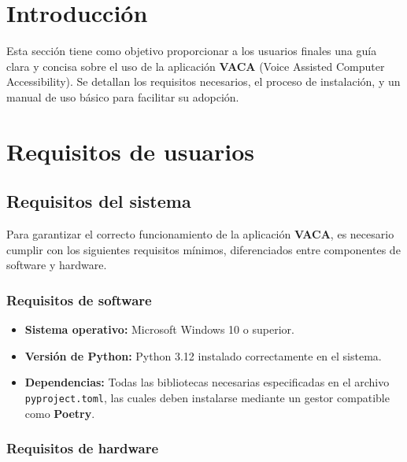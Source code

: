 
\section{Introducción}

Esta sección tiene como objetivo proporcionar a los usuarios finales una guía clara y concisa sobre el uso de la aplicación \textbf{VACA} (Voice Assisted Computer Accessibility). Se detallan los requisitos necesarios, el proceso de instalación, y un manual de uso básico para facilitar su adopción.

\section{Requisitos de usuarios}

\subsection{Requisitos del sistema}

Para garantizar el correcto funcionamiento de la aplicación \textbf{VACA}, es necesario cumplir con los siguientes requisitos mínimos, diferenciados entre componentes de software y hardware.

\subsubsection{Requisitos de software}

\begin{itemize}
    \item \textbf{Sistema operativo:} Microsoft Windows 10 o superior.
    \item \textbf{Versión de Python:} Python 3.12 instalado correctamente en el sistema.
    \item \textbf{Dependencias:} Todas las bibliotecas necesarias especificadas en el archivo \texttt{pyproject.toml}, las cuales deben instalarse mediante un gestor compatible como \textbf{Poetry}.
\end{itemize}

\subsubsection{Requisitos de hardware}

